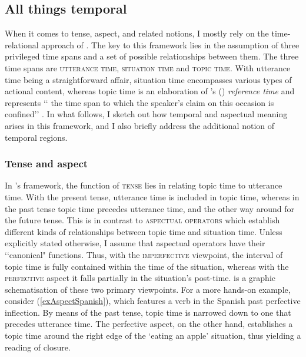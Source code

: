 \subsection{All things temporal}
\label{sectionTenseAspect}
When it comes to tense, aspect, and related notions, I mostly rely on the time-relational approach of \textcite{Klein1994}. The key to this framework lies in the assumption of three privileged time spans and a set of possible relationships between them. The three time spans are \textsc{utterance time}, \textsc{situation time} and \textsc{topic time}. With utterance time being a straightforward affair, situation time encompasses various types of actional content, whereas topic time is an elaboration of \citeauthor{Reichenbach1947}'s (\citeyear{Reichenbach1947}) \textit{reference time} and represents \lq\lq
the time span to which the speaker’s claim on this occasion is confined\rq\rq{ }\parencite[4]{Klein1994}. In what follows, I sketch out how temporal and aspectual meaning arises in this framework, and I also briefly address the additional notion of temporal regions.

\subsubsection{Tense and aspect}\label{sectionTenseAspect2}
In \citeauthor{Klein1994}'s framework, the function of \textsc{tense} lies in relating topic time to utterance time. With the present tense, utterance time is included in topic time, whereas in the past tense topic time precedes utterance time, and the other way around for the future tense. This is in contrast to \textsc{aspectual} \textsc{operators} which establish different kinds of relationships between topic time and situation time. Unless explicitly stated otherwise, I assume that aspectual operators have their \lq\lq canonical" \parencite{Polancec2021} functions. Thus, with the \textsc{imperfective} viewpoint, the interval of topic time is fully contained within the time of the situation, whereas with the \textsc{perfective} aspect it falls partially in the situation's post-time.  is a graphic schematisation of these two primary viewpoints. For a more hands-on example, consider (\ref{exAspectSpanish}), which features a verb in the Spanish past perfective inflection. By means of the past tense, topic time is narrowed down to one that precedes utterance time. The perfective aspect, on the other hand, establishes a topic time around the right edge of the \lq eating an apple\rq{ }situation, thus yielding a reading of closure.

